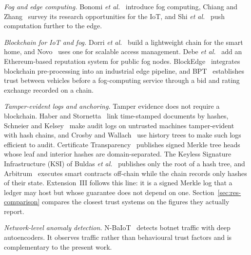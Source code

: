\documentclass[lineno,pdflatex,sn-nature]{sn-jnl}
\theoremstyle{thmstyleone}%
\theoremstyle{thmstylethree}%
\begin{document}
\emph{Fog and edge computing.}  Bonomi \textit{et
al.}~\cite{bonomi2012fog} introduce fog computing, Chiang and
Zhang~\cite{chiang2016fog} survey its research opportunities for the
IoT, and Shi \textit{et
al.}~\cite{shi2016edge} push computation further to the edge.

\emph{Blockchain for IoT and fog.}  Dorri \textit{et
al.}~\cite{dorri2017blockchain} build a lightweight chain for the smart
home, and Novo~\cite{novo2018blockchain} uses one for scalable access
management.  Debe \textit{et
al.}~\cite{debe2019iot} add an Ethereum-based reputation system for
public fog nodes.  BlockEdge~\cite{kumar2020blockedge} integrates
blockchain pre-processing into an industrial edge pipeline, and
BPT~\cite{dewanta2021bpt} establishes trust between vehicles before a
fog-computing service through a bid and rating exchange recorded on a
chain.

\emph{Tamper-evident logs and anchoring.}  Tamper evidence does not
require a blockchain.  Haber and Stornetta~\cite{haber1991time} link
time-stamped documents by hashes, Schneier and
Kelsey~\cite{schneier1999secure} make audit logs on untrusted machines
tamper-evident with hash chains, and Crosby and
Wallach~\cite{crosby2009efficient} use history trees to make such logs
efficient to audit.  Certificate
Transparency~\cite{laurie2013rfc6962} publishes signed Merkle tree
heads whose leaf and interior hashes are domain-separated.  The
Keyless Signature Infrastructure (KSI) of Buldas \textit{et
al.}~\cite{buldas2013ksi} publishes only the root of a hash tree, and
Arbitrum~\cite{kalodner2018arbitrum} executes smart contracts
off-chain while the chain records only hashes of their state.
Extension~III follows this line: it is a signed Merkle log that a
ledger may host but whose guarantee does not depend on one.
Section~\ref{sec:res-comparison} compares the closest trust systems on
the figures they actually report.

\emph{Network-level anomaly detection.}  N-BaIoT~\cite{meidan2018nbaiot}
detects botnet traffic with deep autoencoders.  It observes traffic
rather than behavioural trust factors and is complementary to the
present work.

\end{document}
